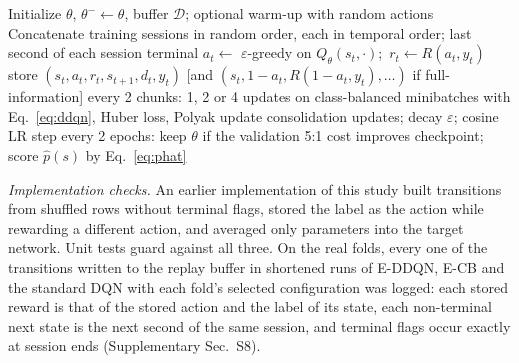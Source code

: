 \begin{algorithm}[t]
\caption{E-DDQN training for one inner split}
\label{alg:eddqn}
\begin{algorithmic}[1]
\small
\State Initialize $\theta$, $\theta^-\!\leftarrow\theta$, buffer $\mathcal{D}$; optional warm-up with random actions
  \State Concatenate training sessions in random order, each in temporal order; last second of each session terminal
    \State $a_t\gets$ $\varepsilon$-greedy on $Q_\theta(s_t,\cdot)$;\ $r_t\gets R(a_t,y_t)$
    \State store $(s_t,a_t,r_t,s_{t+1},d_t,y_t)$ [and $(s_t,1-a_t,R(1-a_t,y_t),\dots)$ if full-information]
    \State every 2 chunks: 1, 2 or 4 updates on class-balanced minibatches with Eq.~\eqref{eq:ddqn}, Huber loss, Polyak update
  \EndFor
   consolidation updates; decay $\varepsilon$; cosine LR step
  \State every 2 epochs: keep $\theta$ if the validation 5:1 cost improves
\EndFor
\State \Return checkpoint; score $\hat p(s)$ by Eq.~\eqref{eq:phat}
\end{algorithmic}
\end{algorithm}

\emph{Implementation checks.} An earlier implementation of this study built transitions from shuffled rows without terminal flags, stored the label as the action while rewarding a different action, and averaged only parameters into the target network. Unit tests guard against all three. On the real folds, every one of the \PVTransitions{} transitions written to the replay buffer in shortened runs of E-DDQN, E-CB and the standard DQN with each fold's selected configuration was logged: each stored reward is that of the stored action and the label of its state, each non-terminal next state is the next second of the same session, and terminal flags occur exactly at session ends (Supplementary Sec.~S8).

